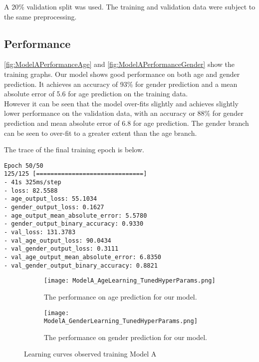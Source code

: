 A 20\% validation split was used. The training and validation data were subject to the same preprocessing.

\subsection{Performance}
\autoref{fig:ModelAPerformanceAge} and \autoref{fig:ModelAPerformanceGender} show the training graphs. 
Our model shows good performance on both age and gender prediction. 
It achieves an accuracy of 93\% for gender prediction and a mean absolute error of 5.6 for age prediction on the training data.\\
However it can be seen that the model over-fits slightly and achieves slightly lower performance on the validation data, with an accuracy or 88\% for gender prediction and mean absolute error of 6.8 for age prediction. 
The gender branch can be seen to over-fit to a greater extent than the age branch.

The trace of the final training epoch is below.
\begin{verbatim}
Epoch 50/50
125/125 [==============================] 
- 41s 325ms/step 
- loss: 82.5588 
- age_output_loss: 55.1034 
- gender_output_loss: 0.1627 
- age_output_mean_absolute_error: 5.5780 
- gender_output_binary_accuracy: 0.9330 
- val_loss: 131.3783 
- val_age_output_loss: 90.0434 
- val_gender_output_loss: 0.3111 
- val_age_output_mean_absolute_error: 6.8350 
- val_gender_output_binary_accuracy: 0.8821
\end{verbatim}

\begin{figure}[h]
    \begin{subfigure}{\textwidth}
        \centering
        \texttt{[image: ModelA\_AgeLearning\_TunedHyperParams.png]}
        \caption{\label{fig:ModelAPerformanceAge} The performance on age prediction for our model.}
    \end{subfigure}
    \begin{subfigure}{\textwidth}
        \centering
        \texttt{[image: ModelA\_GenderLearning\_TunedHyperParams.png]}
        \caption{\label{fig:ModelAPerformanceGender} The performance on gender prediction for our model.}
    \end{subfigure}
    \label{fig:ModelAPerformance}
    \caption{Learning curves observed training Model A}
\end{figure}
